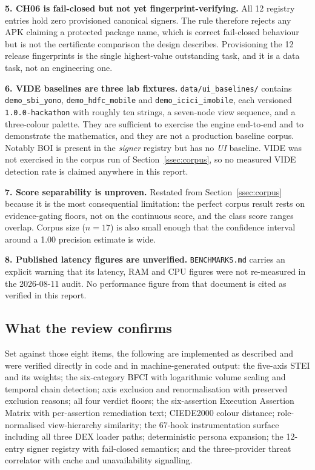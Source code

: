 \documentclass{article}
\begin{document}
\textbf{5. CH06 is fail-closed but not yet fingerprint-verifying.} All 12
registry entries hold zero provisioned canonical signers. The rule therefore
rejects any APK claiming a protected package name, which is correct fail-closed
behaviour but is not the certificate comparison the design describes.
Provisioning the 12 release fingerprints is the single highest-value
outstanding task, and it is a data task, not an engineering one.

\textbf{6. VIDE baselines are three lab fixtures.} \texttt{data/ui\_baselines/}
contains \texttt{demo\_sbi\_yono}, \texttt{demo\_hdfc\_mobile} and
\texttt{demo\_icici\_imobile}, each versioned \texttt{1.0.0-hackathon} with
roughly ten strings, a seven-node view sequence, and a three-colour palette.
They are sufficient to exercise the engine end-to-end and to demonstrate the
mathematics, and they are not a production baseline corpus. Notably BOI is
present in the \emph{signer} registry but has no \emph{UI} baseline. VIDE was
not exercised in the corpus run of Section~\ref{ssec:corpus}, so no measured
VIDE detection rate is claimed anywhere in this report.

\textbf{7. Score separability is unproven.} Restated from
Section~\ref{ssec:corpus} because it is the most consequential limitation: the
perfect corpus result rests on evidence-gating floors, not on the continuous
score, and the class score ranges overlap. Corpus size ($n = 17$) is also small
enough that the confidence interval around a 1.00 precision estimate is wide.

\textbf{8. Published latency figures are unverified.} \texttt{BENCHMARKS.md}
carries an explicit warning that its latency, RAM and CPU figures were not
re-measured in the 2026-08-11 audit. No performance figure from that document is
cited as verified in this report.

\subsection{What the review confirms}
\label{ssec:confirms}

Set against those eight items, the following are implemented as described and
were verified directly in code and in machine-generated output: the five-axis
STEI and its weights; the six-category BFCI with logarithmic volume scaling and
temporal chain detection; axis exclusion and renormalisation with preserved
exclusion reasons; all four verdict floors; the six-assertion Execution
Assertion Matrix with per-assertion remediation text; CIEDE2000 colour distance;
role-normalised view-hierarchy similarity; the 67-hook instrumentation surface
including all three DEX loader paths; deterministic persona expansion; the
12-entry signer registry with fail-closed semantics; and the three-provider
threat correlator with cache and unavailability signalling.
\end{document}
